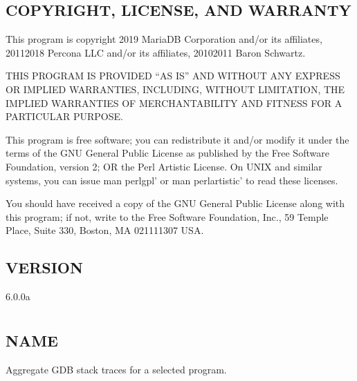 \documentclass[letterpaper,10pt,english]{sphinxmanual}
\begin{document}
\section{COPYRIGHT, LICENSE, AND WARRANTY}
\label{\detokenize{mariadb-schema-change:copyright-license-and-warranty}}
\sphinxAtStartPar
This program is copyright 2019 MariaDB Corporation and/or its affiliates,
2011\sphinxhyphen{}2018 Percona LLC and/or its affiliates, 2010\sphinxhyphen{}2011 Baron Schwartz.

\sphinxAtStartPar
THIS PROGRAM IS PROVIDED “AS IS” AND WITHOUT ANY EXPRESS OR IMPLIED
WARRANTIES, INCLUDING, WITHOUT LIMITATION, THE IMPLIED WARRANTIES OF
MERCHANTABILITY AND FITNESS FOR A PARTICULAR PURPOSE.

\sphinxAtStartPar
This program is free software; you can redistribute it and/or modify it under
the terms of the GNU General Public License as published by the Free Software
Foundation, version 2; OR the Perl Artistic License.  On UNIX and similar
systems, you can issue \textasciigrave{}man perlgpl’ or \textasciigrave{}man perlartistic’ to read these
licenses.

\sphinxAtStartPar
You should have received a copy of the GNU General Public License along with
this program; if not, write to the Free Software Foundation, Inc., 59 Temple
Place, Suite 330, Boston, MA  02111\sphinxhyphen{}1307  USA.


\section{VERSION}
\label{\detokenize{mariadb-schema-change:version}}
\sphinxAtStartPar
{} 6.0.0a


\chapter{}
\label{\detokenize{mariadb-stacktrace:mariadb-stacktrace}}\label{\detokenize{mariadb-stacktrace::doc}}

\section{NAME}
\label{\detokenize{mariadb-stacktrace:name}}
\sphinxAtStartPar
{} \sphinxhyphen{} Aggregate GDB stack traces for a selected program.
\end{document}
